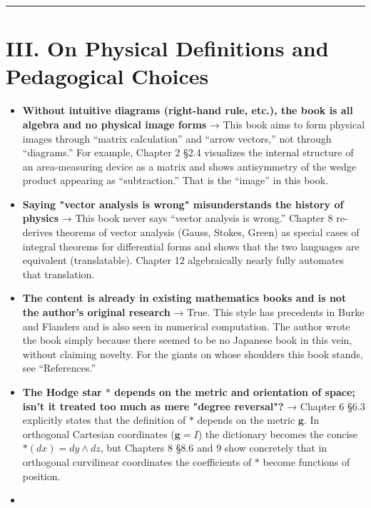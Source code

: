 \begin{center}\rule{0.5\linewidth}{0.5pt}\end{center}

\hypertarget{iii.-on-physical-definitions-and-pedagogical-choices}{%
\section{III. On Physical Definitions and Pedagogical
Choices}\label{iii.-on-physical-definitions-and-pedagogical-choices}}

\begin{itemize}
\item
  \textbf{Without intuitive diagrams (right-hand rule, etc.), the book is all algebra and no physical image forms}
  → This book aims to form physical images through ``matrix
  calculation'' and ``arrow vectors,'' not through ``diagrams.'' For
  example, Chapter 2 §2.4 visualizes the internal structure of an
  area-measuring device as a matrix and shows antisymmetry of the wedge
  product appearing as ``subtraction.'' That is the ``image'' in this
  book.
\item
  \textbf{Saying "vector analysis is wrong" misunderstands the history of physics}
  → This book never says ``vector analysis is wrong.'' Chapter 8
  re-derives theorems of vector analysis (Gauss, Stokes, Green) as
  special cases of integral theorems for differential forms and shows
  that the two languages are equivalent (translatable). Chapter 12
  algebraically nearly fully automates that translation.
\item
  \textbf{The content is already in existing mathematics books and is not the author's original research}
  → True. This style has precedents in Burke and Flanders and is also
  seen in numerical computation. The author wrote the book simply
  because there seemed to be no Japanese book in this vein, without
  claiming novelty. For the giants on whose shoulders this book stands,
  see ``References.''
\item
  \textbf{The Hodge star $\ast$ depends on the metric and orientation of space; isn't it treated too much as mere "degree reversal"?}
  → Chapter 6 §6.3 explicitly states that the definition of \(\ast\)
  depends on the metric \(\mathbf{g}\). In orthogonal Cartesian
  coordinates (\(\mathbf{g}=I\)) the dictionary becomes the concise
  \(\ast(dx)=dy\wedge dz\), but Chapters 8 §8.6 and 9 show concretely
  that in orthogonal curvilinear coordinates the coefficients of
  \(\ast\) become functions of position.
\item

\end{itemize}
